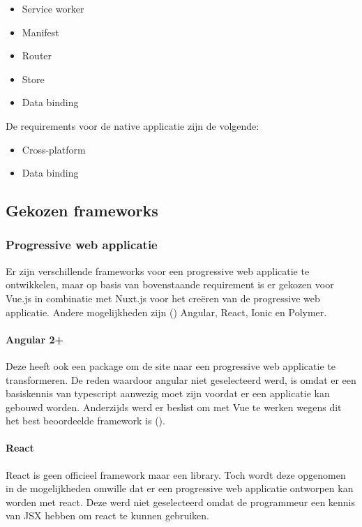 \begin{itemize}
	\item Service worker
	\item Manifest
	\item Router
	\item Store
	\item Data binding
\end{itemize}

De requirements voor de native applicatie zijn de volgende: 
\begin{itemize}
	\item Cross-platform
	\item Data binding
\end{itemize}

\subsection{Gekozen frameworks}
\subsubsection{Progressive web applicatie}
Er zijn verschillende frameworks voor een progressive web applicatie te ontwikkelen, maar op basis van bovenstaande requirement is er gekozen voor Vue.js in combinatie met Nuxt.js voor het creëren van de progressive web applicatie.
Andere mogelijkheden zijn (\cite{FRAMEWORKS_PROGRESSIVEWEBAPPS}) Angular, React, Ionic en Polymer.


\paragraph{Angular 2+}
Deze heeft ook een package om de site naar een progressive web applicatie te transformeren.
De reden waardoor angular niet geselecteerd werd, is omdat er een basiskennis van typescript aanwezig moet zijn voordat er een applicatie kan gebouwd worden. Anderzijds werd er beslist om met Vue te werken wegens dit het best beoordeelde framework is (\cite{VUE_POPULARITY}).

\paragraph{React}
React is geen officieel framework maar een library. Toch wordt deze opgenomen in de mogelijkheden omwille dat er een progressive web applicatie ontworpen kan worden met react. Deze werd niet geselecteerd omdat de programmeur een kennis van JSX hebben om react te kunnen gebruiken.

